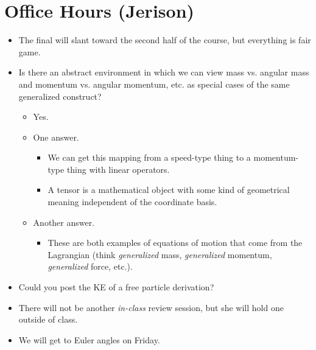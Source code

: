 \documentclass[../notes.tex]{subfiles}
\begin{document}
\section{Office Hours (Jerison)}
\begin{itemize}
    \item {}The final will slant toward the second half of the course, but everything is fair game.
    \item Is there an abstract environment in which we can view mass vs. angular mass and momentum vs. angular momentum, etc. as special cases of the same generalized construct?
    \begin{itemize}
        \item Yes.
        \item One answer.
        \begin{itemize}
            \item We can get this mapping from a speed-type thing to a momentum-type thing with linear operators.
            \item A tensor is a mathematical object with some kind of geometrical meaning independent of the coordinate basis.
        \end{itemize}
        \item Another answer.
        \begin{itemize}
            \item These are both examples of equations of motion that come from the Lagrangian (think \emph{generalized} mass, \emph{generalized} momentum, \emph{generalized} force, etc.).
        \end{itemize}
    \end{itemize}
    \item Could you post the KE of a free particle derivation?
    \item There will not be another \emph{in-class} review session, but she will hold one outside of class.
    \item We will get to Euler angles on Friday.
\end{itemize}
\end{document}
